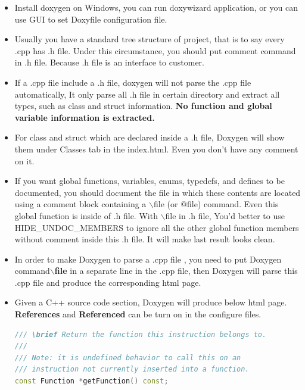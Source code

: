 \documentclass[a4paper,12pt,twoside]{book}
\begin{document}
\begin{itemize}
\item Install doxygen on Windows, you can run doxywizard application, or you can use GUI to set Doxyfile configuration file.

\item Usually you have a standard tree structure of project, that is to say every .cpp has .h file.  Under this circumstance, you should put comment command in .h file. Because .h file is an interface to customer.

\item If a .cpp file include a .h file,  doxygen will not parse the .cpp file automatically, It only parse all .h file in certain directory and extract all types, such as class and struct information. \textbf{No function and global variable information is extracted.} 

\item For class and struct which are declared inside a .h file, Doxygen will show them under Classes tab in the index.html. Even you don't have any comment on it.

\item If you want global functions, variables, enums, typedefs, and defines to be documented, you should document the file in which these contents are located using a comment block containing a $\backslash$file (or @file) command. Even this global function is inside of .h file. With $\backslash$file in .h file, You'd better to use HIDE\_UNDOC\_MEMBERS to ignore all the other global function members without comment inside this .h file. It will make last result looks clean. 

\item In order to make Doxygen to parse a .cpp file , you need to put Doxygen command\textbf{$\backslash$file} in a separate line in the .cpp file, then Doxygen will parse this .cpp file and produce the corresponding html page.

\item Given a C++ source code section, Doxygen will produce below html page.  \textbf{References} and \textbf{Referenced} can be turn on in the configure files.

\begin{lstlisting}[frame=single, language=c++]
/// \brief Return the function this instruction belongs to.
///
/// Note: it is undefined behavior to call this on an
/// instruction not currently inserted into a function.
const Function *getFunction() const;
\end{lstlisting}


\end{itemize}
\end{document}
